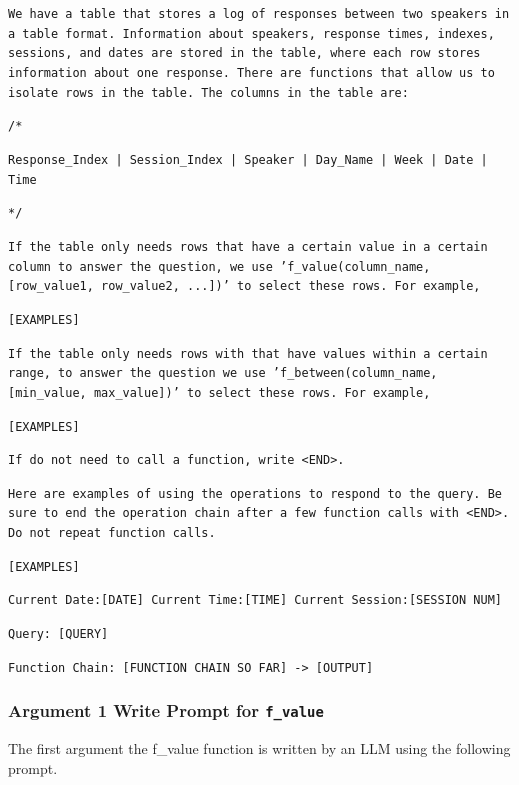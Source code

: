 \documentclass{article}
\begin{document}
\colorbox{prompt_gray}{\begin{minipage}{.98\textwidth}
\texttt{We have a table that stores a log of responses between two speakers in a table format. Information about speakers, response times, indexes, sessions, and dates are stored in the table, where each row stores information about one response. There are functions that allow us to isolate rows in the table. The columns in the table are:}
\newline

\texttt{/*}

\texttt{Response\_Index | Session\_Index | Speaker | Day\_Name | Week | Date | Time}

\texttt{*/}
\newline

\texttt{If the table only needs rows that have a certain value in a certain column to answer the question, we use 'f\_value(column\_name, [row\_value1, row\_value2, ...])' to select these rows. For example,}
\newline

\texttt{[EXAMPLES]}
\newline

\texttt{If the table only needs rows with that have values within a certain range, to answer the question we use 'f\_between(column\_name, [min\_value, max\_value])' to select these rows. For example,}
\newline

\texttt{[EXAMPLES]}
\newline

\texttt{If do not need to call a function, write <END>.}
\newline

\texttt{Here are examples of using the operations to respond to the query. Be sure to end the operation chain after a few function calls with <END>. Do not repeat function calls.}
\newline

\texttt{[EXAMPLES]}
\newline

\texttt{Current Date:[DATE] Current Time:[TIME] Current Session:[SESSION NUM]}

\texttt{Query: [QUERY]}

\texttt{Function Chain: [FUNCTION CHAIN SO FAR] -> [OUTPUT]}
\end{minipage}}


\newpage
\subsubsection{Argument 1 Write Prompt for \texttt{f\_value}}
The first argument the f\_value function is written by an LLM using the following prompt.
\end{document}
